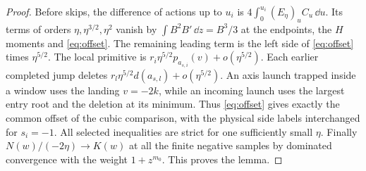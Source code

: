 \begin{proof}
Before skips, the difference of actions up to $u_i$ is
$4\int_0^{u_i} (E_\eta)_u C_u\,\dd u$. Its terms of orders $\eta,\eta^{3/2},\eta^2$
vanish by $\int B^2 B'\,\dd z=B^3/3$ at the endpoints, the $H$ moments and
\eqref{eq:offset}. The remaining leading term is the left side of
\eqref{eq:offset} times $\eta^{5/2}$. The local primitive is
$r_i\eta^{5/2}p_{a_{s,i}}(v)+o(\eta^{5/2})$. Each earlier completed
jump deletes $r_l\eta^{5/2}d(a_{s,l})+o(\eta^{5/2})$. An axis launch
trapped inside a window uses the landing $v=-2k$, while an incoming
launch uses the largest entry root and the deletion at its minimum.
Thus \eqref{eq:offset} gives exactly the common offset of the cubic
comparison, with the physical side labels interchanged for $s_i=-1$.
All selected inequalities are strict for one sufficiently small $\eta$.
Finally $N(w)/(-2\eta)\to K(w)$ at all the finite negative samples by
dominated convergence with the weight $1+z^{m_0}$. This proves the lemma.
\end{proof}

